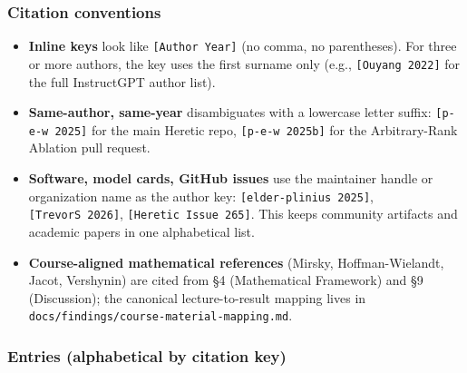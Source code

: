 \documentclass[
  11pt,
]{article}
\providecommand{\tightlist}{%
  \setlength{\itemsep}{0pt}\setlength{\parskip}{0pt}}
\begin{document}
\subsubsection{Citation conventions}\label{citation-conventions}

\begin{itemize}
\tightlist
\item
  \textbf{Inline keys} look like \texttt{{[}Author\ Year{]}} (no comma,
  no parentheses). For three or more authors, the key uses the first
  surname only (e.g., \texttt{{[}Ouyang\ 2022{]}} for the full
  InstructGPT author list).
\item
  \textbf{Same-author, same-year} disambiguates with a lowercase letter
  suffix: \texttt{{[}p-e-w\ 2025{]}} for the main Heretic repo,
  \texttt{{[}p-e-w\ 2025b{]}} for the Arbitrary-Rank Ablation pull
  request.
\item
  \textbf{Software, model cards, GitHub issues} use the maintainer
  handle or organization name as the author key:
  \texttt{{[}elder-plinius\ 2025{]}}, \texttt{{[}TrevorS\ 2026{]}},
  \texttt{{[}Heretic\ Issue\ 265{]}}. This keeps community artifacts and
  academic papers in one alphabetical list.
\item
  \textbf{Course-aligned mathematical references} (Mirsky,
  Hoffman-Wielandt, Jacot, Vershynin) are cited from §4 (Mathematical
  Framework) and §9 (Discussion); the canonical lecture-to-result
  mapping lives in \texttt{docs/findings/course-material-mapping.md}.
\end{itemize}

\subsubsection{Entries (alphabetical by citation
key)}\label{entries-alphabetical-by-citation-key}
\end{document}
